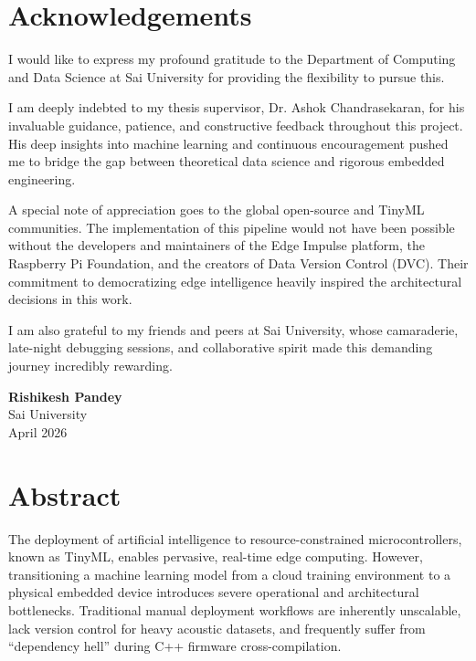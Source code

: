 \documentclass[11pt,a4paper,openany]{book}
\begin{document}

\chapter*{Acknowledgements}

I would like to express my profound gratitude to the Department of Computing and Data Science at Sai University for providing the flexibility to pursue this.

I am deeply indebted to my thesis supervisor, Dr. Ashok Chandrasekaran, for his invaluable guidance, patience, and constructive feedback throughout this project. His deep insights into machine learning and continuous encouragement pushed me to bridge the gap between theoretical data science and rigorous embedded engineering.

A special note of appreciation goes to the global open-source and TinyML communities. The implementation of this pipeline would not have been possible without the developers and maintainers of the Edge Impulse platform, the Raspberry Pi Foundation, and the creators of Data Version Control (DVC). Their commitment to democratizing edge intelligence heavily inspired the architectural decisions in this work.

I am also grateful to my friends and peers at Sai University, whose camaraderie, late-night debugging sessions, and collaborative spirit made this demanding journey incredibly rewarding.

\vspace{20pt}
\noindent
\textbf{Rishikesh Pandey}\\
Sai University\\
April 2026

\clearpage

\chapter*{Abstract}

The deployment of artificial intelligence to resource-constrained microcontrollers, known as TinyML, enables pervasive, real-time edge computing. However, transitioning a machine learning model from a cloud training environment to a physical embedded device introduces severe operational and architectural bottlenecks. Traditional manual deployment workflows are inherently unscalable, lack version control for heavy acoustic datasets, and frequently suffer from ``dependency hell'' during C++ firmware cross-compilation.
\end{document}
